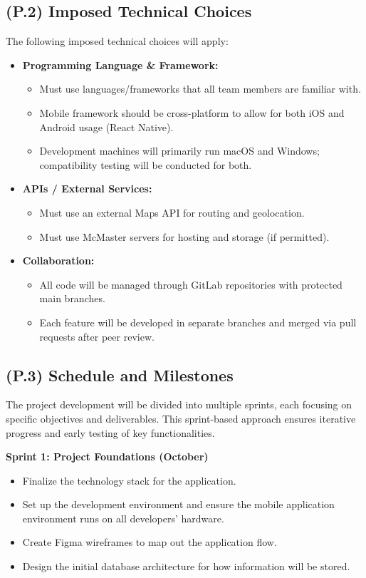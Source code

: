 \documentclass[12pt,letterpaper]{article}
\begin{document}
\subsection{(P.2) Imposed Technical Choices}
The following imposed technical choices will apply:
\begin{itemize}
  \item \textbf{Programming Language \& Framework:}
  \begin{itemize}
      \item Must use languages/frameworks that all team members are familiar with.
      \item Mobile framework should be cross-platform to allow for both iOS and Android usage (React Native).
      \item Development machines will primarily run macOS and Windows; compatibility testing will be conducted for both.
  \end{itemize}

  \item \textbf{APIs / External Services:}
  \begin{itemize}
      \item Must use an external Maps API for routing and geolocation.
      \item Must use McMaster servers for hosting and storage (if permitted).
  \end{itemize}

  \item \textbf{Collaboration:}
  \begin{itemize}
    \item All code will be managed through GitLab repositories with protected main branches.
    \item Each feature will be developed in separate branches and merged via pull requests after peer review.
  \end{itemize}
\end{itemize}

\subsection{(P.3) Schedule and Milestones}

The project development will be divided into multiple sprints, each focusing on specific objectives and deliverables. This sprint-based approach ensures iterative progress and early testing of key functionalities.

\textbf{Sprint 1: Project Foundations (October)}
\begin{itemize}
    \item Finalize the technology stack for the application.
    \item Set up the development environment and ensure the mobile application environment runs on all developers’ hardware.
    \item Create Figma wireframes to map out the application flow.
    \item Design the initial database architecture for how information will be stored.
\end{itemize}
\end{document}
